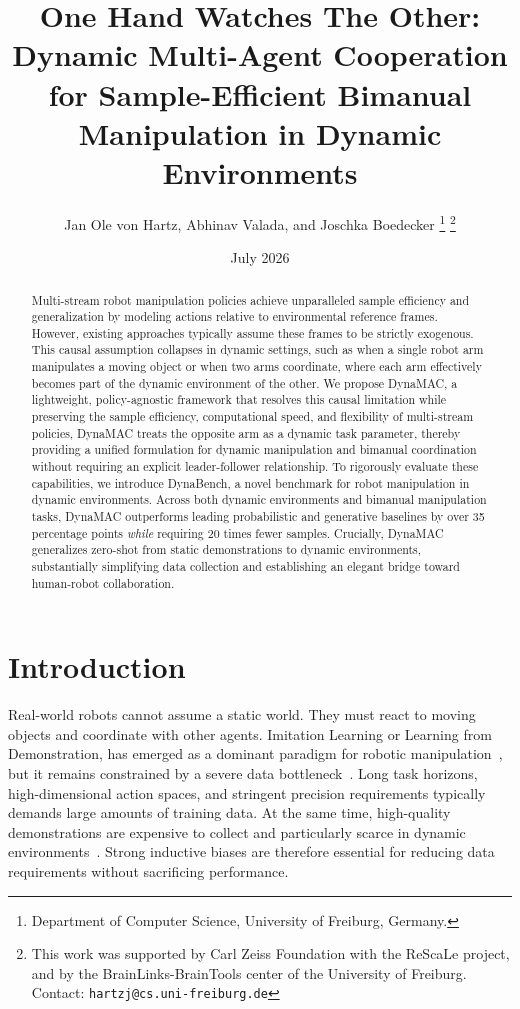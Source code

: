\documentclass[letterpaper, 10 pt, journal, twoside]{IEEEtran}
\title{\LARGE \bf
%
%
%
One Hand Watches The Other: Dynamic Multi-Agent Cooperation for Sample-Efficient Bimanual Manipulation in Dynamic Environments}
\author{
Jan Ole von Hartz, Abhinav Valada, and Joschka Boedecker%
\thanks{Department of Computer Science, University of Freiburg, Germany.}%
\thanks{This work was supported by Carl Zeiss Foundation with the ReScaLe project, and by the BrainLinks-BrainTools center of the University of Freiburg. {Contact: \tt\footnotesize hartzj@cs.uni-freiburg.de}}%
}
\date{July 2026}
\newcommand{\ourmethod}{DynaMAC\xspace}
\newcommand{\ourbench}{DynaBench\xspace}
\begin{document}
\maketitle

\begin{abstract}
%
Multi-stream robot manipulation policies achieve unparalleled sample efficiency and generalization by modeling actions relative to environmental reference frames.
%
%
%
%
However, existing approaches typically assume these frames to be strictly exogenous.
This causal assumption collapses in dynamic settings, such as when a single robot arm manipulates a moving object or when two arms coordinate, where each arm effectively becomes part of the dynamic environment of the other.
We propose \ourmethod{}, a lightweight, policy-agnostic framework that resolves this causal limitation while preserving the sample efficiency, computational speed, and flexibility of multi-stream policies,
\ourmethod{} treats the opposite arm as a dynamic task parameter,  thereby providing a unified formulation for dynamic manipulation and bimanual coordination without requiring an explicit leader-follower relationship.
%
%
%
%
%
%
%
%
%
%
%
%
%
%
%
%
%
To rigorously evaluate these capabilities, we introduce \ourbench{}, a novel benchmark for robot manipulation in dynamic environments.
Across both dynamic environments and bimanual manipulation tasks, \ourmethod{} outperforms leading probabilistic and generative baselines by over 35 percentage points \emph{while} requiring 20 times fewer samples.
%
%
%
%
%
%
%
%
Crucially, \ourmethod{} generalizes zero-shot from static demonstrations to dynamic environments, substantially simplifying data collection and establishing an elegant bridge toward human-robot collaboration.
%
%
\end{abstract}


\section{Introduction}
Real-world robots cannot assume a static world.
They must react to moving objects and coordinate with other agents.
Imitation Learning or Learning from Demonstration, has emerged as a dominant paradigm for robotic manipulation~\cite{chi2023diffusionpolicy}, but it remains constrained by a severe data bottleneck~\cite{von2024art}.
Long task horizons, high-dimensional action spaces, and stringent precision requirements typically demands large amounts of training data.
At the same time, high-quality demonstrations are expensive to collect and particularly scarce in dynamic environments~\cite{fang2026towards}.
%
Strong inductive biases are therefore essential for reducing data requirements without sacrificing performance.
%
\end{document}
